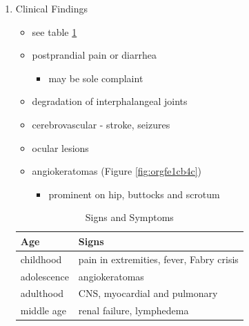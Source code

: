 \documentclass{scrartcl}
\begin{document}
\begin{enumerate}
\item Clinical Findings
\label{sec:org254343f}
\begin{itemize}
\item see table \ref{tab:org95346b3}
\item postprandial pain or diarrhea
\begin{itemize}
\item may be sole complaint
\end{itemize}
\item degradation of interphalangeal joints
\item cerebrovascular - stroke, seizures
\item ocular lesions
\item angiokeratomas (Figure \ref{fig:orgfe1cb4c})
\begin{itemize}
\item prominent on hip, buttocks and scrotum
\end{itemize}
\end{itemize}

\begin{table}[htbp]
\caption{\label{tab:org95346b3}
Signs and Symptoms}
\centering
\begin{tabular}{ll}
Age & Signs\\
\hline
childhood & pain in extremities, fever, Fabry crisis \footnotemark\\
adolescence & angiokeratomas\\
adulthood & CNS, myocardial and pulmonary\\
middle age & renal failure, lymphedema\\
\end{tabular}
\end{table}


\end{enumerate}
\end{document}
